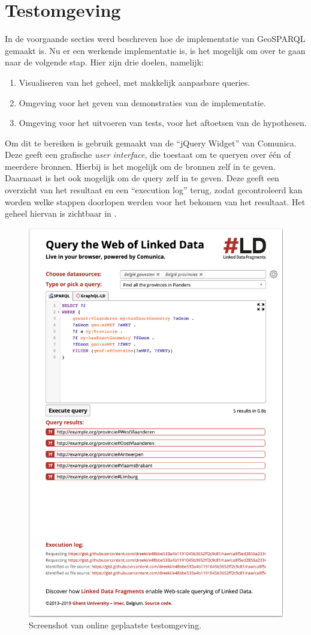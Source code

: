 \section{Testomgeving}
\label{sec:testomgeving}
In de voorgaande secties werd beschreven hoe de implementatie van GeoSPARQL gemaakt is. Nu er een werkende implementatie is, is het mogelijk om over te gaan naar de volgende stap. Hier zijn drie doelen, namelijk:
\begin{enumerate}
    \item Visualiseren van het geheel, met makkelijk aanpasbare queries.
    \item Omgeving voor het geven van demonstraties van de implementatie.
    \item Omgeving voor het uitvoeren van tests, voor het aftoetsen van de hypothesen.
\end{enumerate}

Om dit te bereiken is gebruik gemaakt van de ``jQuery Widget'' van Comunica. Deze geeft een grafische \textit{user interface}, die toestaat om te queryen over één of meerdere bronnen. Hierbij is het mogelijk om de bronnen zelf in te geven. Daarnaast is het ook mogelijk om de query zelf in te geven. Deze geeft een overzicht van het resultaat en een ``execution log'' terug, zodat gecontroleerd kan worden welke stappen doorlopen werden voor het bekomen van het resultaat. Het geheel hiervan is zichtbaar in .

\begin{figure}
    \centering
    \includegraphics[width=0.8\linewidth]{images/testomgeving.png}
    \caption{Screenshot van online geplaatste testomgeving.}
    \label{fig:testomgeving}
\end{figure}

